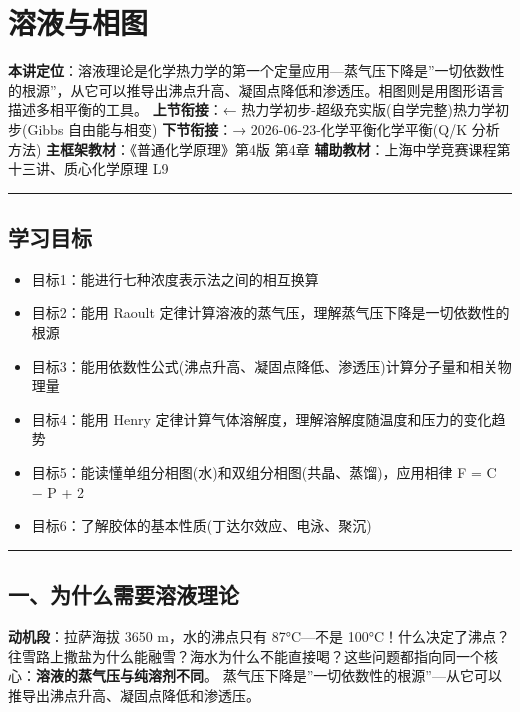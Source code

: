 \section{溶液与相图}\label{ux6eb6ux6db2ux4e0eux76f8ux56fe}

\textbf{本讲定位}：溶液理论是化学热力学的第一个定量应用---蒸气压下降是''一切依数性的根源''，从它可以推导出沸点升高、凝固点降低和渗透压。相图则是用图形语言描述多相平衡的工具。
\textbf{上节衔接}：← 热力学初步-超级充实版(自学完整)\textbar 热力学初步(Gibbs 自由能与相变)
\textbf{下节衔接}：→ 2026-06-23-化学平衡\textbar 化学平衡(Q/K 分析方法)
\textbf{主框架教材}：《普通化学原理》第4版 第4章
\textbf{辅助教材}：上海中学竞赛课程第十三讲、质心化学原理 L9

\begin{center}\rule{0.5\linewidth}{0.5pt}\end{center}

\subsection{学习目标}\label{ux5b66ux4e60ux76eeux6807}

\begin{itemize}
\tightlist
\item
  目标1：能进行七种浓度表示法之间的相互换算
\item
  目标2：能用 Raoult 定律计算溶液的蒸气压，理解蒸气压下降是一切依数性的根源
\item
  目标3：能用依数性公式(沸点升高、凝固点降低、渗透压)计算分子量和相关物理量
\item
  目标4：能用 Henry 定律计算气体溶解度，理解溶解度随温度和压力的变化趋势
\item
  目标5：能读懂单组分相图(水)和双组分相图(共晶、蒸馏)，应用相律 F = C − P + 2
\item
  目标6：了解胶体的基本性质(丁达尔效应、电泳、聚沉)
\end{itemize}

\begin{center}\rule{0.5\linewidth}{0.5pt}\end{center}

\subsection{一、为什么需要溶液理论}\label{ux4e00ux4e3aux4ec0ux4e48ux9700ux8981ux6eb6ux6db2ux7406ux8bba}

\textbf{动机段}：拉萨海拔 3650 m，水的沸点只有 87°C---不是 100°C！什么决定了沸点？往雪路上撒盐为什么能融雪？海水为什么不能直接喝？这些问题都指向同一个核心：\textbf{溶液的蒸气压与纯溶剂不同}。
蒸气压下降是''一切依数性的根源''---从它可以推导出沸点升高、凝固点降低和渗透压。

